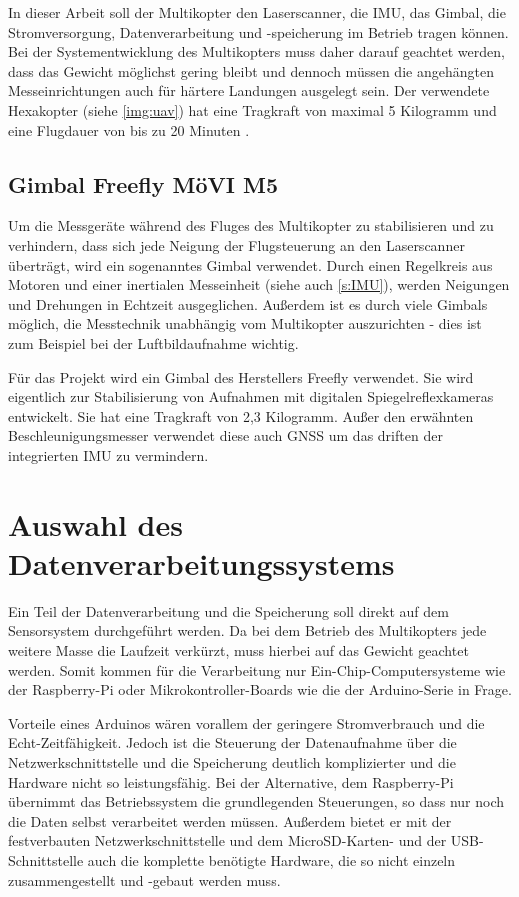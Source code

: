 \documentclass[a4paper,12pt,bibliography=totoc, listof=totoc,titlepage,pointlessnumbers]{scrreprt}
\begin{document}
In dieser Arbeit soll der Multikopter den Laser\-scan\-ner, die IMU, das Gimbal, die Stromversorgung, Datenverarbeitung und -speicherung im Betrieb tragen können. Bei der Systementwicklung des Multikopters muss daher darauf geachtet werden, dass das Gewicht möglichst gering bleibt und dennoch müssen die angehängten Messeinrichtungen auch für härtere Landungen ausgelegt sein. Der verwendete Hexakopter (siehe \autoref{img:uav}) hat eine Tragkraft von maximal 5 Kilogramm und eine Flugdauer von bis zu 20 Minuten \citep{Schulz}.

\subsection{Gimbal Freefly MöVI M5}
Um die Messgeräte während des Fluges des Multikopter zu stabilisieren und zu verhindern, dass sich jede Neigung der Flugsteuerung an den Laser\-scan\-ner überträgt, wird ein sogenanntes Gimbal verwendet. Durch einen Regelkreis aus Motoren und einer inertialen Messeinheit (siehe auch \autoref{s:IMU}), werden Neigungen und Drehungen in Echtzeit ausgeglichen. Außerdem ist es durch viele Gimbals möglich, die Messtechnik unabhängig vom Multikopter auszurichten - dies ist zum Beispiel bei der Luftbildaufnahme wichtig.

Für das Projekt wird ein Gimbal des Herstellers Freefly verwendet. Sie wird eigentlich zur Stabilisierung von Aufnahmen mit digitalen Spiegelreflexkameras entwickelt. Sie hat eine Tragkraft von 2,3 Kilogramm. Außer den erwähnten Beschleunigungsmesser verwendet diese auch GNSS um das driften der integrierten IMU zu vermindern. \citep{movim5}


\section{Auswahl des Datenverarbeitungssystems}

Ein Teil der Datenverarbeitung und die Speicherung soll direkt auf dem Sensorsystem durchgeführt werden. Da bei dem Betrieb des Multikopters jede weitere Masse die Laufzeit verkürzt, muss hierbei auf das Gewicht geachtet werden. Somit kommen für die Verarbeitung nur Ein-Chip-Computersysteme wie der Raspberry-Pi oder Mikrokontroller-Boards wie die der Arduino-Serie in Frage. 

Vorteile eines Arduinos wären vorallem der geringere Stromverbrauch und die Echt-Zeitfähigkeit. Jedoch ist die Steuerung der Datenaufnahme über die Netzwerkschnittstelle und die Speicherung deutlich komplizierter und die Hardware nicht so leistungsfähig. Bei der Alternative, dem Raspberry-Pi übernimmt das Betriebssystem die grundlegenden Steuerungen, so dass nur noch die Daten selbst verarbeitet werden müssen. Außerdem bietet er mit der festverbauten Netzwerkschnittstelle und dem MicroSD-Karten- und der USB-Schnittstelle auch die komplette benötigte Hardware, die so nicht einzeln zusammengestellt und -gebaut werden muss.
\end{document}
